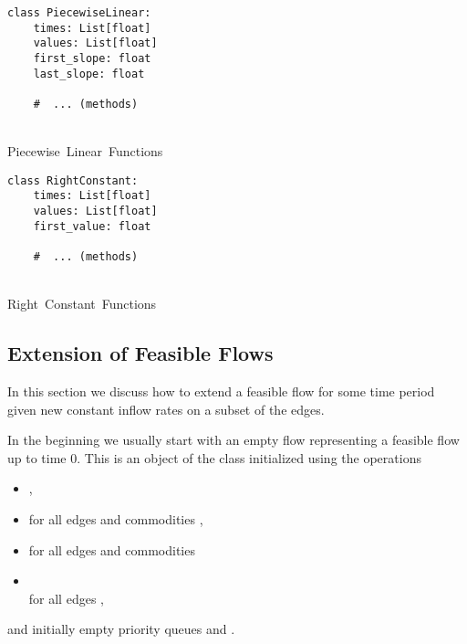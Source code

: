 \begin{minipage}[t]{0.5\textwidth}
\begin{classdef}[H]
    \begin{verbatim}
class PiecewiseLinear:
    times: List[float]
    values: List[float]
    first_slope: float
    last_slope: float

    #  ... (methods)
\end{verbatim}
    \caption{\\Piecewise~Linear~Functions\vphantom{Right}}%
    \label{data:piecewise-linear}
\end{classdef}
\end{minipage}\hfill
\begin{minipage}[t]{0.5\textwidth}
\begin{classdef}[H]
    \begin{verbatim}
class RightConstant:
    times: List[float]
    values: List[float]
    first_value: float

    #  ... (methods)

\end{verbatim}
    \vspace{.084em}
    \caption{\\Right~Constant~Functions}%
    \label{data:right-constant}
\end{classdef}
\end{minipage}


\subsection{Extension of Feasible Flows}

In this section we discuss how to extend a feasible flow for some time period given new constant inflow rates on a subset of the edges.

In the beginning we usually start with an empty flow representing a feasible flow up to time $0$.
This is an object of the class  initialized using the operations
\begin{itemize}
\setlength{\itemsep}{0em}
\item {},
\item {} for all edges  and commodities ,
\item {} for all edges  and commodities 
\item {}\\ for all edges ,
\end{itemize}
and initially empty priority queues  and .

